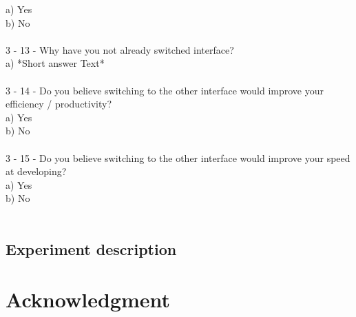 \documentclass[]{report}
\begin{document}
	a) Yes\\
	b) No\\\\
	3 - 13 - Why have you not already switched interface?\\
	a) *Short answer Text*\\\\
	3 - 14 - Do you believe switching to the other interface would improve your efficiency / productivity?\\
	a) Yes\\
	b) No\\\\
	3 - 15 - Do you believe switching to the other interface would improve your speed at developing?\\
	a) Yes\\
	b) No\\\\
	
	\subsection{Experiment description}
	
	\section{Acknowledgment}


\printbibliography[title=References]
\end{document}
